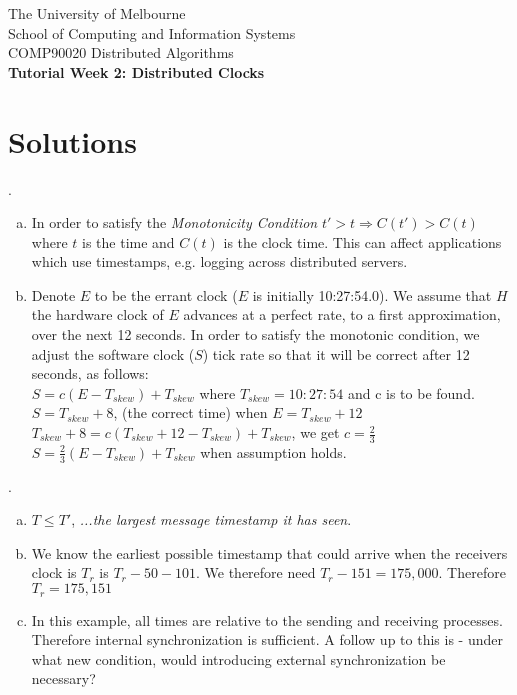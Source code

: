 \documentclass[12pt]{article}
\newcounter{question}
\newcommand{\question}[1]{
    \stepcounter{question}
    \thequestion. #1 \hfill
}
\begin{document}
\begin{center}
{\sc The University of Melbourne
\\
School of Computing and Information Systems
\\ 
COMP90020 Distributed Algorithms}
\bigskip \\
{\Large\bf Tutorial Week 2: Distributed Clocks}
\end{center}
\section*{Solutions}

\question{}

\begin{enumerate}[(a)]
    \item In order to satisfy the \textit{Monotonicity Condition} $t' > t \Rightarrow C(t') > C(t)$ where $t$ is the time and $C(t)$ is the clock time. This can affect applications which use timestamps, e.g. logging across distributed servers.
    \item Denote $E$ to be the errant clock ($E$ is initially 10:27:54.0). We assume that $H$ the hardware clock of $E$ advances at a perfect rate, to a first approximation, over the next 12 seconds. In order to satisfy the monotonic condition, we adjust the software clock ($S$) tick rate so that it will be correct after 12 seconds, as follows:\\
         $S  =  c(E-T_{skew})+T_{skew}$ where $T_{skew} = 10:27:54$ and c is to be found.\\
         $S =  T_{skew} + 8$, (the correct time) when $E= T_{skew} + 12$ \\
         $T_{skew} + 8  =  c(T_{skew} + 12 - T_{skew}) + T_{skew}$, we get $c = \frac{2}{3}$ \\
         $S = \frac{2}{3}(E -  T_{skew}) + T_{skew}$ when assumption holds.
\end{enumerate}

\question{}
    \begin{enumerate}[(a)]
        \item $T \leq T'$, \textit{...the largest message timestamp it has seen}.
        \item We know the earliest possible timestamp that could arrive when the receivers clock is $T_r$ is $T_r - 50 - 101$. We therefore need $T_r - 151 = 175,000$. Therefore $T_r = 175,151$
        \item In this example, all times are relative to the sending and receiving processes. Therefore internal synchronization is sufficient. A follow up to this is - under what new condition, would introducing external synchronization be necessary?
    \end{enumerate}
    
\end{document}
